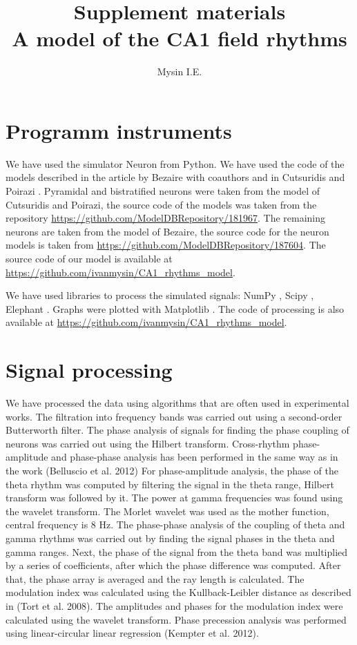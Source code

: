 \documentclass[a4paper,12pt]{article}
\title{Supplement materials \\[1ex] \large A model of the CA1 field rhythms}
\author{Mysin I.E.}
\date{}
\begin{document}
\maketitle

\section{Programm instruments}
We have used the simulator Neuron from Python. We have used the code of the models described in the article by Bezaire with coauthors \cite{bezaire_interneuronal_2016} and in Cutsuridis and Poirazi \cite{cutsuridis_computational_2015}. Pyramidal and bistratified neurons were taken from the model of Cutsuridis and Poirazi, the source code of the models was taken from the repository \url{https://github.com/ModelDBRepository/181967}. The remaining neurons are taken from the model of Bezaire, the source code for the neuron models is taken from \url{https://github.com/ModelDBRepository/187604}. The source code of our model is available at \url{https://github.com/ivanmysin/CA1\_rhythms\_model}. \par
We have used libraries to process the simulated signals: NumPy \cite{2020NumPy-Array}, Scipy \cite{2020SciPy-NMeth}, Elephant \cite{elephant18}. Graphs were plotted with Matplotlib \cite{Hunter:2007}. The code of processing is also available at \url{https://github.com/ivanmysin/CA1\_rhythms\_model}. 

\section{Signal processing}
We have processed the data using algorithms that are often used in experimental works. The filtration into frequency bands was carried out using a second-order Butterworth filter. The phase analysis of signals for finding the phase coupling of neurons was carried out using the Hilbert transform.
Cross-rhythm phase-amplitude and phase-phase analysis has been performed in the same way as in the work (Belluscio et al. 2012) For phase-amplitude analysis, the phase of the theta rhythm was computed by filtering the signal in the theta range, Hilbert transform was followed by it. The power at gamma frequencies was found using the wavelet transform. The Morlet wavelet was used as the mother function, central frequency is 8 Hz. The phase-phase analysis of the coupling of theta and gamma rhythms was carried out by finding the signal phases in the theta and gamma ranges. Next, the phase of the signal from the theta band was multiplied by a series of coefficients, after which the phase difference was computed. After that, the phase array is averaged and the ray length is calculated. The modulation index was calculated using the Kullback-Leibler distance as described in (Tort et al. 2008). The amplitudes and phases for the modulation index were calculated using the wavelet transform.
Phase precession analysis was performed using linear-circular linear regression (Kempter et al. 2012).
\end{document}
